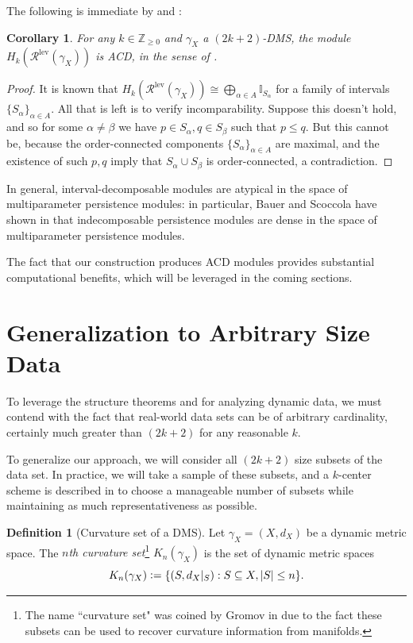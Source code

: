 \documentclass[a4paper,UKenglish,thm-restate]{article}
\newtheorem{corollary}[theorem]{Corollary}
\theoremstyle{definition}
\newtheorem{definition}[theorem]{Definition}
\newcommand{\defeq}{\vcentcolon=}
\begin{document}
    The following is immediate by  and :
    \begin{corollary} \label{cor:curvaturesetsacd}
        For any $k \in \mathbb{Z}_{\geq 0}$ and $\gamma_X$ a $(2k+2)$-DMS, the module $H_k(\mathcal{R}^{\mathrm{lev}}(\gamma_X))$ is ACD, in the sense of .
    \end{corollary}
    \begin{proof}
        It is known that $H_k(\mathcal{R}^{\mathrm{lev}}(\gamma_X)) \cong \bigoplus_{\alpha \in A} \mathbb{I}_{S_\alpha}$ for a family of intervals $\{S_\alpha\}_{\alpha \in A}$. All that is left is to verify incomparability. Suppose this doesn't hold, and so for some $\alpha \neq \beta$ we have $p \in S_\alpha, q \in S_\beta$ such that $p \leq q$. But this cannot be, because the order-connected components $\{S_\alpha\}_{\alpha \in A}$ are maximal, and the existence of such $p, q$ imply that $S_\alpha \cup S_\beta$ is order-connected, a contradiction.
    \end{proof}
    In general, interval-decomposable modules are atypical in the space of multiparameter persistence modules: in particular, Bauer and Scoccola have shown in \cite{multiparameterindecomposable} that indecomposable persistence modules are dense in the space of multiparameter persistence modules.

    The fact that our construction produces ACD modules provides substantial computational benefits, which will be leveraged in the coming sections.

\section{Generalization to Arbitrary Size Data}
    To leverage the structure theorems  and  for analyzing dynamic data, we must contend with the fact that real-world data sets can be of arbitrary cardinality, certainly much greater than $(2k+2)$ for any reasonable $k$.

    To generalize our approach, we will consider all $(2k+2)$ size subsets of the data set. In practice, we will take a sample of these subsets, and a $k$-center scheme is described in  to choose a manageable number of subsets while maintaining as much representativeness as possible.
    \begin{definition}[Curvature set of a DMS]
        Let $\gamma_X = (X, d_X)$ be a dynamic metric space. The \emph{$n$th curvature set}\footnote{The name ``curvature set" was coined by Gromov in \cite{Gromov1999MetricSF} due to the fact these subsets can be used to recover curvature information from manifolds.} $K_n(\gamma_X)$ is the set of dynamic metric spaces
        \[K_n(\gamma_X) \defeq \{ (S, d_X |_S) : S \subseteq X, |S| \leq n \}.\]
    \end{definition}
\end{document}
